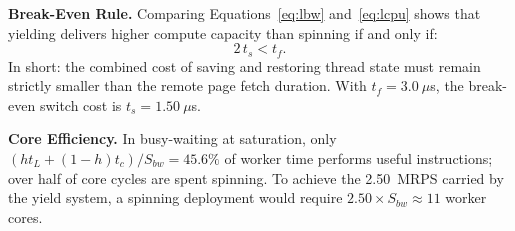\textbf{Break-Even Rule.} Comparing Equations~\eqref{eq:lbw} and~\eqref{eq:lcpu} shows that yielding delivers higher compute capacity than spinning if and only if:
\begin{equation}
2\,t_s < t_f.
\label{eq:breakeven}
\end{equation}
In short: the combined cost of saving and restoring thread state must remain strictly smaller than the remote page fetch duration. With $t_f = 3.0~\mu$s, the break-even switch cost is $t_s = 1.50~\mu$s.

\textbf{Core Efficiency.} In busy-waiting at saturation, only $(h t_L + (1-h)t_c) / S_{bw} = 45.6\%$ of worker time performs useful instructions; over half of core cycles are spent spinning. To achieve the 2.50~MRPS carried by the yield system, a spinning deployment would require $2.50 \times S_{bw} \approx 11$ worker cores.
